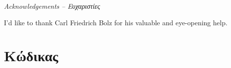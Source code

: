 \documentclass[11pt, english, singlespacing, parskip, headsepline]{MastersDoctoralThesis}
\begin{document}

\newpage\null\thispagestyle{empty}\newpage
\thispagestyle{plain}
\begin{center}{\huge\textit{Acknowledgements – Ευχαριστίες}\par}\end{center}
\vspace{3cm}

I'd like to thank Carl Friedrich Bolz for his valuable and eye-opening help.


\tableofcontents



\mainmatter %

\pagestyle{thesis}





\section*{Κώδικας}



\printbibliography
\end{document}
